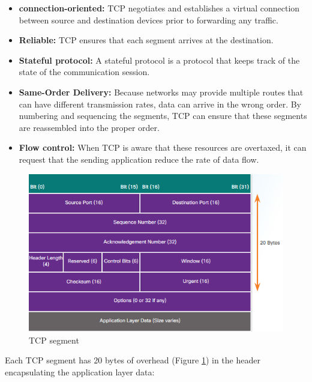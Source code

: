 \begin{itemize}
\item  \textbf{connection-oriented:} TCP negotiates and establishes a virtual connection between source and destination devices prior to forwarding any traffic.

\item \textbf{Reliable:} TCP ensures that each segment arrives at the destination. 

\item \textbf{Stateful protocol:} A stateful protocol is a protocol that keeps track of the state of the communication session. 

\item \textbf{Same-Order Delivery:} Because networks may provide multiple routes that can have different transmission rates, data can arrive in the wrong order. By numbering and sequencing the segments, TCP can ensure that these segments are reassembled into the proper order.

\item \textbf{Flow control:} When TCP is aware that these resources are overtaxed, it can request that the sending application reduce the rate of data flow. 
\end{itemize}

\begin{figure}[hbtp]
\caption{TCP segment}\label{TCPheader}
\centering
\includegraphics[scale=0.5]{pictures/TCPheader.PNG}
\end{figure}


Each TCP segment has 20 bytes of overhead (Figure \ref{TCPheader}) in the header encapsulating the application layer data:

